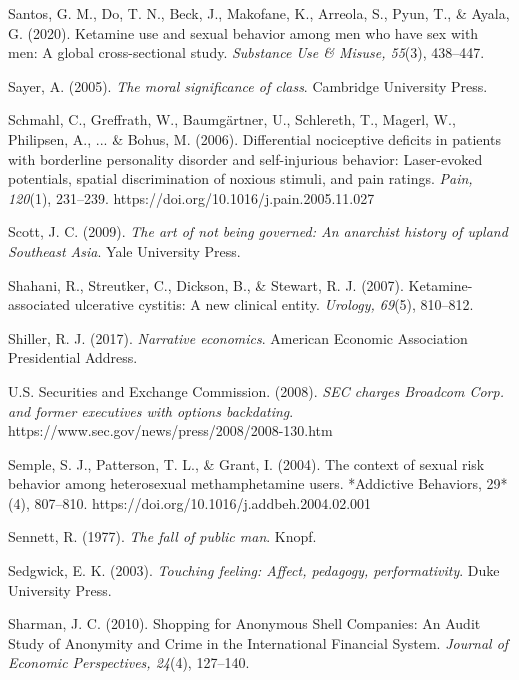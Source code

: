 \begin{thebibliography}{}
    Santos, G. M., Do, T. N., Beck, J., Makofane, K., Arreola, S., Pyun, T., \& Ayala, G. (2020). Ketamine use and sexual behavior among men who have sex with men: A global cross-sectional study. \textit{Substance Use \& Misuse, 55}(3), 438–447.

    Sayer, A. (2005). \textit{The moral significance of class}. Cambridge University Press.

    Schmahl, C., Greffrath, W., Baumgärtner, U., Schlereth, T., Magerl, W., Philipsen, A., ... \& Bohus, M. (2006). Differential nociceptive deficits in patients with borderline personality disorder and self-injurious behavior: Laser-evoked potentials, spatial discrimination of noxious stimuli, and pain ratings. \textit{Pain, 120}(1), 231–239. https://doi.org/10.1016/j.pain.2005.11.027

    Scott, J. C. (2009). \textit{The art of not being governed: An anarchist history of upland Southeast Asia}. Yale University Press.
    
    Shahani, R., Streutker, C., Dickson, B., \& Stewart, R. J. (2007). Ketamine-associated ulcerative cystitis: A new clinical entity. \textit{Urology, 69}(5), 810–812.

    Shiller, R. J. (2017). \textit{Narrative economics}. American Economic Association Presidential Address.

    U.S. Securities and Exchange Commission. (2008). \textit{SEC charges Broadcom Corp. and former executives with options backdating}. https://www.sec.gov/news/press/2008/2008-130.htm

    Semple, S. J., Patterson, T. L., \& Grant, I. (2004). The context of sexual risk behavior among heterosexual methamphetamine users. *Addictive Behaviors, 29*(4), 807–810. https://doi.org/10.1016/j.addbeh.2004.02.001

    Sennett, R. (1977). \textit{The fall of public man}. Knopf.

    Sedgwick, E. K. (2003). \textit{Touching feeling: Affect, pedagogy, performativity}. Duke University Press.

    Sharman, J. C. (2010). Shopping for Anonymous Shell Companies: An Audit Study of Anonymity and Crime in the International Financial System. \textit{Journal of Economic Perspectives, 24}(4), 127–140.


\end{thebibliography}
